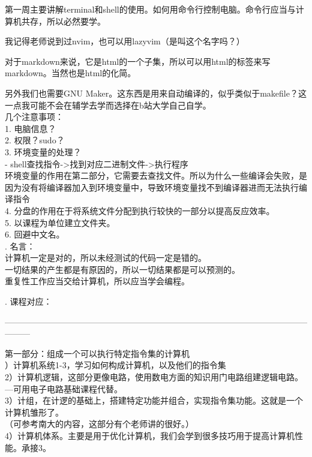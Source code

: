 \documentclass{article}
\begin{document}
第一周主要讲解terminal和shell的使用。如何用命令行控制电脑。命令行应当与计算机共存，所以必然要学。

我记得老师说到过nvim，也可以用lazyvim（是叫这个名字吗？）

对于markdown来说，它是html的一个子集，所以可以用html的标签来写markdown。当然也是html的化简。

另外我们也需要GNU Maker。这东西是用来自动编译的，似乎类似于makefile？这一点我可能不会在辅学去学而选择在b站大学自己自学。
\\

\noindent 几个注意事项：\\
1. 电脑信息？\\
2. 权限？sudo？\\
3. 环境变量的处理？\\
- shell查找指令->找到对应二进制文件->执行程序\\
环境变量的作用在第二部分，它需要去查找文件。所以为什么一些编译会失败，是因为没有将编译器加入到环境变量中，导致环境变量找不到编译器进而无法执行编译指令\\
4. 分盘的作用在于将系统文件分配到执行较快的一部分以提高反应效率。\\
5. 以课程为单位建立文件夹。\\
6. 回避中文名。\\

. 名言：\\
计算机一定是对的，所以未经测试的代码一定是错的。\\
一切结果的产生都是有原因的，所以一切结果都是可以预测的。\\
重复性工作应当交给计算机，所以应当学会编程。

. 课程对应：

\begin{center}
    ———————————————————————————————————————
\end{center}
第一部分：组成一个可以执行特定指令集的计算机\\

）计算机系统1-3，学习如何构成计算机，以及他们的指令集\\
2）计算机逻辑，这部分更像电路，使用数电方面的知识用门电路组建逻辑电路。---可用电子电路基础课程代替。\\
3）计组，在计逻的基础上，搭建特定功能并组合，实现指令集功能。这就是一个计算机雏形了。\\
（可参考南大的内容，这部分有个老师讲的很好。）\\
4）计算机体系。主要是用于优化计算机，我们会学到很多技巧用于提高计算机性能。承接3。
\end{document}
